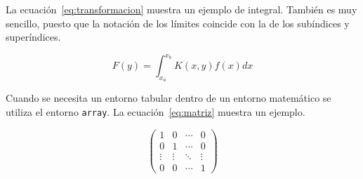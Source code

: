 La ecuación~\ref{eq:transformacion} muestra un ejemplo de integral.  También es muy sencillo, puesto que la notación de los límites coincide con la de los subíndices y superíndices.

\begin{equation}
F(y) =  \int_{x_a}^{x_b} K(x,y) f(x) dx
\label{eq:transformacion}
\end{equation}

Cuando se necesita un entorno tabular dentro de un entorno matemático se utiliza el entorno \texttt{array}. La ecuación~\ref{eq:matriz} muestra un ejemplo.

\begin{equation}
\left(
\begin{array}{cccc}
1 & 0 & \cdots & 0 \\
0 & 1 & \cdots & 0 \\
\vdots & \vdots & \ddots & \vdots \\
0 & 0 & \cdots & 1
\end{array}
\right)
\label{eq:matriz}
\end{equation}
